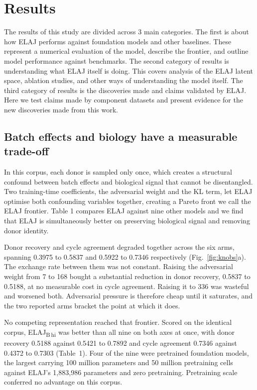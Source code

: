 \documentclass[11pt]{article}
\newcommand{\elaj}{ELAJ\xspace}
\begin{document}
\section*{Results}

The results of this study are divided across 3 main categories. The first is 
about how \elaj performs against foundation models and other baselines. These 
represent a numerical evaluation of the model, describe the frontier, and 
outline model performance against benchmarks. The second category of results is 
understanding what \elaj itself is doing. This covers analysis of the \elaj 
latent space, ablation studies, and other ways of understanding the model itself.
The third category of results is the discoveries made and claims validated 
by \elaj. Here we test claims made by component datasets and present evidence 
for the new discoveries made from this work.

\subsection*{Batch effects and biology have a measurable trade-off}

In this corpus, each donor is sampled only once, which creates a structural 
confound between batch effects and biological signal that cannot be 
disentangled. Two training-time coefficients, the adversarial weight and the 
KL term, let \elaj{} optimise both confounding variables together, creating a 
Pareto front we call the \elaj{} frontier. Table 1 compares \elaj against 
nine other models and we find that \elaj is simultaneously better on 
preserving biological signal and removing donor identity.

Donor recovery and cycle agreement degraded together across the six arms,
spanning 0.3975 to 0.5837 and 0.5922 to 0.7346 respectively
(Fig.~\ref{fig:knobs}a). The exchange rate between them was not constant.
Raising the adversarial weight from 7 to 168 bought a substantial reduction
in donor recovery, 0.5837 to 0.5188, at no measurable cost in cycle
agreement. Raising it to 336 was wasteful and worsened both. Adversarial
pressure is therefore cheap until it saturates, and the two reported arms
bracket the point at which it does.

No competing representation reached that frontier. Scored on the identical
corpus, \elaj\textsubscript{B\,hi} was better than all nine on both axes at once, with
donor recovery 0.5188 against 0.5421 to 0.7892 and cycle agreement 0.7346
against 0.4372 to 0.7303 (Table~1). Four of the nine were pretrained
foundation models, the largest carrying 100 million parameters and 50 million
pretraining cells \citep{hao2024scfoundation} against \elaj{}'s 1,883,986 
parameters and zero pretraining. Pretraining scale conferred no advantage 
on this corpus.
\end{document}
